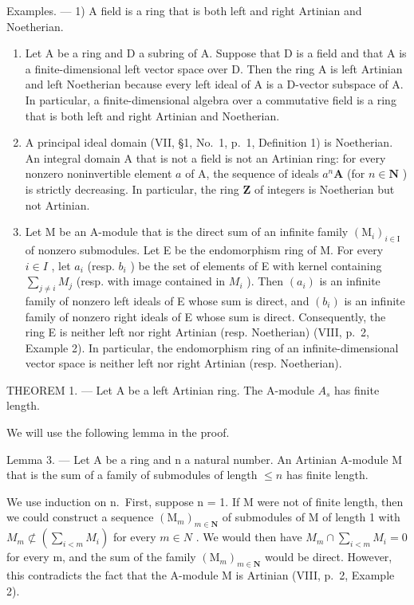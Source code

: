 Examples. --- 1) A field is a ring that is both left and right Artinian and Noetherian.

\begin{enumerate}
\def\labelenumi{\arabic{enumi})}
\setcounter{enumi}{1}
\item
  Let A be a ring and D a subring of A. Suppose that D is a field and that A is a finite-dimensional left vector space over D. Then the ring A is left Artinian and left Noetherian because every left ideal of A is a D-vector subspace of A. In particular, a finite-dimensional algebra over a commutative field is a ring that is both left and right Artinian and Noetherian.
\item
  A principal ideal domain (VII, §1, No.~1, p.~1, Definition 1) is Noetherian. An integral domain A that is not a field is not an Artinian ring: for every nonzero noninvertible element \(a\) of A, the sequence of ideals \(a^n\mathbf{A}\) (for \(n \in \mathbf{N}\) ) is strictly decreasing. In particular, the ring \(\mathbf{Z}\) of integers is Noetherian but not Artinian.
\item
  Let M be an A-module that is the direct sum of an infinite family \((\mathrm{M}_{i})_{i\in\mathrm{I}}\) of nonzero submodules. Let E be the endomorphism ring of M. For every \(i\in I\) , let \(a_{i}\) (resp. \(b_{i}\) ) be the set of elements of E with kernel containing \(\sum_{j\neq i}M_{j}\) (resp. with image contained in \(M_{i}\) ). Then \((a_{i})\) is an infinite family of nonzero left ideals of E whose sum is direct, and \((b_{i})\) is an infinite family of nonzero right ideals of E whose sum is direct. Consequently, the ring E is neither left nor right Artinian (resp. Noetherian) (VIII, p.~2, Example 2). In particular, the endomorphism ring of an infinite-dimensional vector space is neither left nor right Artinian (resp. Noetherian).
\end{enumerate}

THEOREM 1. --- Let A be a left Artinian ring. The A-module \(A_{s}\) has finite length.

We will use the following lemma in the proof.

Lemma 3. --- Let A be a ring and n a natural number. An Artinian A-module M that is the sum of a family of submodules of length \(\leqslant n\) has finite length.

We use induction on n.~First, suppose n = 1. If M were not of finite length, then we could construct a sequence \((\mathrm{M}_{m})_{m \in \mathbf{N}}\) of submodules of M of length 1 with \(M_{m} \not\subset (\sum_{i < m} M_{i})\) for every \(m \in N\) . We would then have \(M_{m} \cap \sum_{i < m} M_{i} = 0\) for every m, and the sum of the family \((\mathrm{M}_{m})_{m \in \mathbf{N}}\) would be direct. However, this contradicts the fact that the A-module M is Artinian (VIII, p.~2, Example 2).


